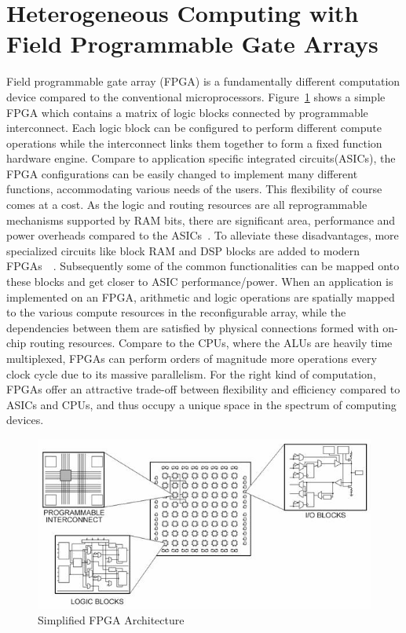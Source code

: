 \section{Heterogeneous Computing with Field Programmable Gate Arrays}
\label{chap1:het}
Field programmable gate array (FPGA) is a fundamentally different computation device
compared to the conventional microprocessors. Figure~\ref{fig:fpgaArch}
shows a simple FPGA which contains a matrix
of logic blocks connected by programmable interconnect. Each logic block
can be configured to perform different compute operations while the interconnect links them together to form a fixed function hardware engine.
Compare to application specific integrated circuits(ASICs), the FPGA configurations can be easily changed to implement many different functions,
accommodating various needs of the users.
This flexibility of course comes at a cost. As the logic and
routing resources are all reprogrammable mechanisms supported by RAM bits, there are significant
area, performance and power overheads compared to the ASICs~\cite{4068926}. To alleviate these disadvantages, 
more specialized circuits like block RAM and DSP blocks are added to modern
FPGAs~\cite{chips:virtex5}~\cite{chips:arria}. Subsequently some of the common functionalities can be mapped onto
these blocks and get closer to ASIC performance/power. When an application
is implemented on an FPGA, arithmetic and logic operations are spatially mapped to
the various compute resources in the reconfigurable array, while the dependencies between them
are satisfied by physical connections formed with on-chip routing resources. Compare to the CPUs, where the ALUs are heavily time
multiplexed, FPGAs can perform orders of magnitude more operations every clock cycle due to its
massive parallelism. For the right kind of computation, FPGAs offer an attractive
trade-off between flexibility and efficiency compared to ASICs and CPUs, and
thus occupy a unique space in the spectrum of computing devices.



\begin{figure}[htp]
\begin{center}
\includegraphics[width=0.8\linewidth]{chap1fig/archsim.jpg}
\caption{Simplified FPGA Architecture~\cite{fpgafun}
\label{fig:fpgaArch}}
\end{center}
\end{figure}

